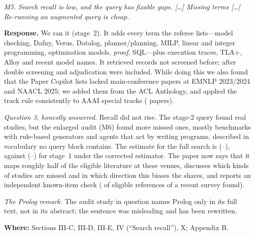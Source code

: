 \documentclass[10pt,a4paper]{article}
\newenvironment{referee}{\par\medskip\noindent\begin{minipage}{\linewidth}\color{black!65}\itshape}{\end{minipage}\par\smallskip}
\newcommand{\resp}{\noindent\textbf{Response.} }
\newcommand{\where}[1]{\par\noindent\textbf{Where:} #1\par}
\begin{document}
\begin{referee}M5. Search recall is low, and the query has fixable gaps. [\ldots] Missing terms [\ldots] Re-running an augmented query is cheap.\end{referee}
\resp We ran it (stage~2). It adds every term the referee lists---model checking, Dafny, Verus, Datalog, planner/planning, MILP, linear and integer programming, optimisation models, \emph{proof}, SQL---plus execution traces, TLA+, Alloy and recent model names. It retrieved  records not screened before; after double screening and adjudication  were included. While doing this we also found that the Paper Copilot lists lacked  main-conference papers at EMNLP 2023/2024 and NAACL 2025; we added them from the ACL Anthology, and applied the track rule consistently to AAAI special tracks ( papers).

\emph{Question 3, honestly answered.} Recall did not rise. The stage-2 query found real studies, but the enlarged audit (M6) found more missed ones, mostly benchmarks with rule-based generators and agents that act by writing programs, described in vocabulary no query block contains. The estimate for the full search is  (--), against  (--) for stage~1 under the corrected estimator. The paper now says that it maps roughly half of the eligible literature at these venues, discusses which kinds of studies are missed and in which direction this biases the shares, and reports an independent known-item check ( of  eligible references of a recent survey found).

\emph{The Prolog remark.} The audit study in question names Prolog only in its full text, not in its abstract; the sentence was misleading and has been rewritten.
\where{Sections III-C, III-D, III-E, IV (``Search recall''), X; Appendix B.}
\end{document}
